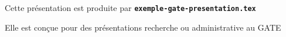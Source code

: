  \item Cette présentation est produite par \texttt{\textbf{exemple-gate-presentation.tex}}
  \item Elle est conçue pour des présentations recherche ou administrative au GATE
